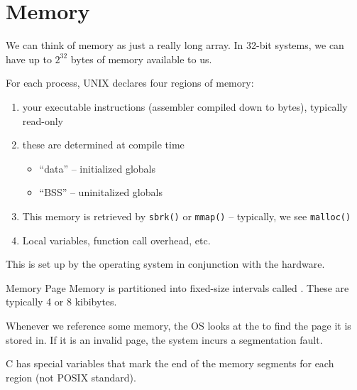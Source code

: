 \documentclass[code]{amznotes}
\begin{document}


\chapter{Memory}
We can think of memory as just a really long array. In 32-bit systems, we can have up to $2^{32}$ bytes of memory available to us.

For each process, UNIX declares four regions of memory:
\begin{enumerate}[noitemsep]
    \item {} your executable instructions (assembler compiled down to bytes), typically read-only
    \item {} these are determined at compile time
    \begin{itemize}[noitemsep]
        \item ``data'' -- initialized globals
        \item ``BSS'' -- uninitalized globals
    \end{itemize}
    \item {} This memory is retrieved by \texttt{sbrk()} or \texttt{mmap()} -- typically, we see \texttt{malloc()}
    \item {} Local variables, function call overhead, etc. 
\end{enumerate}
This is set up by the operating system in conjunction with the hardware.

\begin{dfnbox}{Memory Page}{}
Memory is partitioned into fixed-size intervals called . These are typically 4 or 8 kibibytes.
\end{dfnbox}

Whenever we reference some memory, the OS looks at the  to find the page it is stored in. If it is an invalid page, the system incurs a segmentation fault.

C has special variables that mark the end of the memory segments for each region (not POSIX standard).

\amzindex
\end{document}
